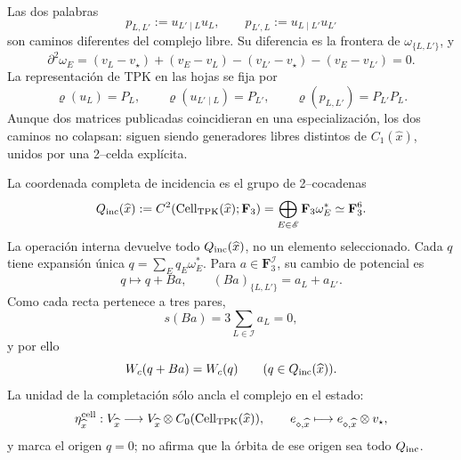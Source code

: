 Las dos palabras
\[
 p_{L,L'}:=u_{L'\mid L}u_L,\qquad
 p_{L',L}:=u_{L\mid L'}u_{L'}
\]
son caminos diferentes del complejo libre. Su diferencia es la frontera de
\(\omega_{\{L,L'\}}\), y
\begin{equation}
\label{rm:eq:pdfv2-cor-cell-dos-cero}
 \partial^2\omega_E
 =(v_L-v_\star)+(v_E-v_L)
 -(v_{L'}-v_\star)-(v_E-v_{L'})=0.
\end{equation}
La representación de TPK en las hojas se fija por
\[
 \varrho(u_L)=P_L,\qquad
 \varrho(u_{L'\mid L})=P_{L'},\qquad
 \varrho(p_{L,L'})=P_{L'}P_L.
\]
Aunque dos matrices publicadas coincidieran en una especialización, los dos
caminos no colapsan: siguen siendo generadores libres distintos de
\(C_1(\widehat x)\), unidos por una 2--celda explícita.

La coordenada completa de incidencia es el grupo de 2--cocadenas
\begin{equation}
\label{rm:eq:pdfv2-cor-q-incidencia-total}
 Q_{\rm inc}(\widehat x):=
 C^2(\operatorname{Cell}_{\rm TPK}(\widehat x);\mathbf F_3)
 =\bigoplus_{E\in\mathscr E}\mathbf F_3\omega_E^*
 \simeq\mathbf F_3^6.
\end{equation}
La operación interna devuelve todo \(Q_{\rm inc}(\widehat x)\), no un
elemento seleccionado. Cada \(q\) tiene expansión única
\(q=\sum_Eq_E\omega_E^*\). Para
\(a\in\mathbf F_3^{\mathscr I}\), su cambio de potencial es
\begin{equation}
\label{rm:eq:pdfv2-cor-collar-variacion}
 q\longmapsto q+Ba,\qquad (Ba)_{\{L,L'\}}=a_L+a_{L'}.
\end{equation}
Como cada recta pertenece a tres pares,
\[
 s(Ba)=3\sum_{L\in\mathscr I}a_L=0,
\]
y por ello
\begin{equation}
\label{rm:eq:pdfv2-cor-wc-invariante-celular}
 W_c(q+Ba)=W_c(q)\qquad(q\in Q_{\rm inc}(\widehat x)).
\end{equation}
La unidad de la completación sólo ancla el complejo en el estado:
\begin{equation}
\label{rm:eq:pdfv2-cor-cell-unidad}
 \eta^{\rm cell}_{\widehat x}:V_{\widehat x}\longrightarrow
 V_{\widehat x}\otimes C_0(\operatorname{Cell}_{\rm TPK}(\widehat x)),\qquad
 e_{\diamond,\widehat x}\longmapsto
 e_{\diamond,\widehat x}\otimes v_\star,
\end{equation}
y marca el origen \(q=0\); no afirma que la órbita de ese origen sea todo
\(Q_{\rm inc}\).

